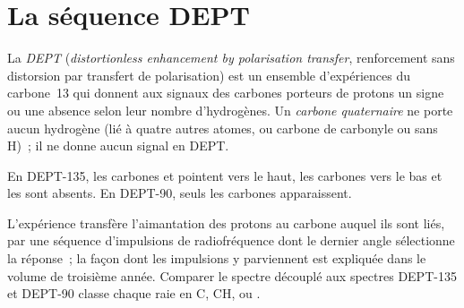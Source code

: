 \section{La séquence DEPT}

\begin{definition}[DEPT]\label{def:b2:structure-determination:dept}
La \emph{DEPT} (\textit{distortionless enhancement by polarisation transfer}, renforcement sans
distorsion par transfert de polarisation) est un ensemble d'expériences du carbone~13 qui donnent aux
signaux des carbones porteurs de protons un signe ou une absence selon leur nombre d'hydrogènes. Un
\emph{carbone quaternaire} ne porte aucun hydrogène (lié à quatre autres
atomes, ou carbone de carbonyle ou  sans H)~; il ne donne aucun signal en DEPT.
\end{definition}

\begin{proposition}\label{prop:b2:structure-determination:dept}
En DEPT-135, les carbones  et  pointent vers le haut, les carbones  vers le bas
et les  sont absents. En DEPT-90, seuls les carbones  apparaissent.
\end{proposition}

\admitted

L'expérience transfère l'aimantation des protons au carbone auquel ils sont liés, par une séquence
d'impulsions de radiofréquence dont le dernier angle sélectionne la réponse~; la façon dont les
impulsions y parviennent est expliquée dans le volume de troisième année. Comparer le spectre découplé
aux spectres DEPT-135 et DEPT-90 classe chaque raie en C, CH,  ou .

